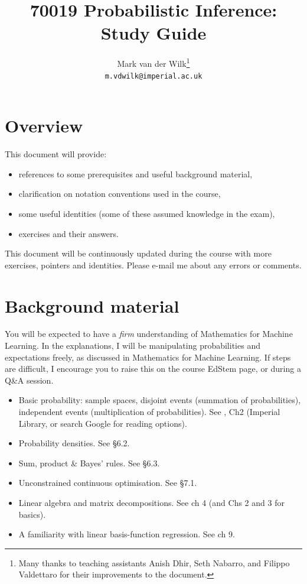 \documentclass[a4paper]{article}
\title{70019 Probabilistic Inference: Study Guide}
\author{Mark van der Wilk\footnote{Many thanks to teaching assistants Anish Dhir, Seth Nabarro, and Filippo Valdettaro for their improvements to the document.} \\ \texttt{m.vdwilk@imperial.ac.uk}}
\theoremstyle{definition}
\begin{document}
\maketitle


\section{Overview}
This document will provide:
\begin{itemize}
\item references to some prerequisites and useful background material,
\item clarification on notation conventions used in the course,
\item some useful identities (some of these assumed knowledge in the exam),
\item exercises and their answers.
\end{itemize}
This document will be continuously updated during the course with more exercises, pointers and identities. Please e-mail me about any errors or comments.


\section{Background material}
You will be expected to have a \emph{firm} understanding of Mathematics for Machine Learning. In the explanations, I will be manipulating probabilities and expectations freely, as discussed in Mathematics for Machine Learning. If steps are difficult, I encourage you to raise this on the course EdStem page, or during a Q\&A session.

\begin{itemize}
\item Basic probability: sample spaces, disjoint events (summation of probabilities), independent events (multiplication of probabilities). See \citet{walpole2012probability}, Ch2 (Imperial Library, or search Google for reading options).
\item Probability densities. See \citet{mml} \S 6.2.
\item Sum, product \& Bayes' rules. See \citet{mml} \S 6.3.
\item Unconstrained continuous optimisation. See \citet{mml} \S 7.1.
\item Linear algebra and matrix decompositions. See \citet{mml} ch 4 (and Chs 2 and 3 for basics).
\item A familiarity with linear basis-function regression. See \citet{mml} ch 9.
\end{itemize}
\end{document}
